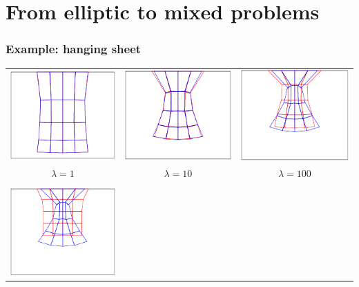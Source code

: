 \documentclass[ignorenonframetext,notheorems,aspectratio=1610]{beamer}
\begin{document}
\frame{\tableofcontents}
\section{From elliptic to mixed problems}

\begin{frame}
  \frametitle{Example: hanging sheet}
  \centering
  \begin{tabular}{ccc}
    \includegraphics[width=.25\textwidth]{./graph/elasticity/stalactite-0}
    &\includegraphics[width=.25\textwidth]{./graph/elasticity/stalactite-1}
    &\includegraphics[width=.25\textwidth]{./graph/elasticity/stalactite-2}
    \\
    $\lambda = 1$&$\lambda = 10$&$\lambda = 100$
    \\\\
    \includegraphics[width=.25\textwidth]{./graph/elasticity/stalactite-3}

\end{tabular}
\end{frame}
\end{document}
